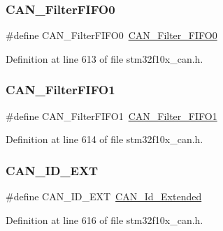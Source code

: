 \subsubsection{\texorpdfstring{C\+A\+N\+\_\+\+Filter\+F\+I\+F\+O0}{CAN\_FilterFIFO0}}
{\footnotesize\ttfamily \#define C\+A\+N\+\_\+\+Filter\+F\+I\+F\+O0~\hyperlink{group___c_a_n__filter___f_i_f_o_ga8249c27978ca94676530540b88a6be8f}{C\+A\+N\+\_\+\+Filter\+\_\+\+F\+I\+F\+O0}}



Definition at line 613 of file stm32f10x\+\_\+can.\+h.

\mbox{\label{group___c_a_n___legacy_gada8f9b3a9c88f36539aaeb457039e666}} 
\subsubsection{\texorpdfstring{C\+A\+N\+\_\+\+Filter\+F\+I\+F\+O1}{CAN\_FilterFIFO1}}
{\footnotesize\ttfamily \#define C\+A\+N\+\_\+\+Filter\+F\+I\+F\+O1~\hyperlink{group___c_a_n__filter___f_i_f_o_gaab8478c89a607c4b8baf68efc730e316}{C\+A\+N\+\_\+\+Filter\+\_\+\+F\+I\+F\+O1}}



Definition at line 614 of file stm32f10x\+\_\+can.\+h.

\mbox{\label{group___c_a_n___legacy_ga5f6fdd1dc3d312af1ac30e2eee15d6f0}} 
\subsubsection{\texorpdfstring{C\+A\+N\+\_\+\+I\+D\+\_\+\+E\+XT}{CAN\_ID\_EXT}}
{\footnotesize\ttfamily \#define C\+A\+N\+\_\+\+I\+D\+\_\+\+E\+XT~\hyperlink{group___c_a_n__identifier__type_gaf6c5c0b43b968fed17fd90246912b1a7}{C\+A\+N\+\_\+\+Id\+\_\+\+Extended}}



Definition at line 616 of file stm32f10x\+\_\+can.\+h.

